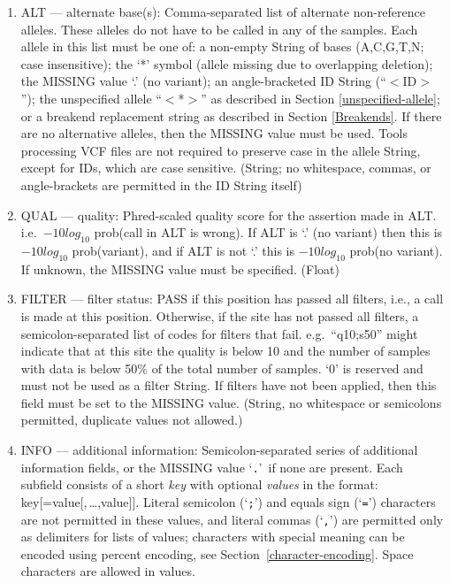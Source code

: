 \documentclass[8pt]{article}
\begin{document}
\begin{enumerate}
  \item ALT --- alternate base(s): Comma-separated list of alternate non-reference alleles.
  \label{fixed-fields-alt}
  These alleles do not have to be called in any of the samples.
  Each allele in this list must be one of: a non-empty String of bases (A,C,G,T,N; case insensitive); the `*' symbol (allele missing due to overlapping deletion); the MISSING value `.' (no variant); an angle-bracketed ID String (``$<$ID$>$''); the unspecified allele ``$<$*$>$'' as described in Section \ref{unspecified-allele}; or a breakend replacement string as described in Section \ref{Breakends}.
  If there are no alternative alleles, then the MISSING value must be used.
  Tools processing VCF files are not required to preserve case in the allele String, except for IDs, which are case sensitive.
  (String; no whitespace, commas, or angle-brackets are permitted in the ID String itself)
  \item QUAL --- quality: Phred-scaled quality score for the assertion made in ALT. i.e.\ $-10log_{10}$ prob(call in ALT is wrong).
  If ALT is `.' (no variant) then this is $-10log_{10}$ prob(variant), and if ALT is not `.' this is $-10log_{10}$ prob(no variant).
  If unknown, the MISSING value must be specified. (Float)
  \item FILTER --- filter status: PASS if this position has passed all filters, i.e., a call is made at this position.
  Otherwise, if the site has not passed all filters, a semicolon-separated list of codes for filters that fail. e.g.\ ``q10;s50'' might indicate that at this site the quality is below 10 and the number of samples with data is below 50\% of the total number of samples.
  `0' is reserved and must not be used as a filter String.
  If filters have not been applied, then this field must be set to the MISSING value.
  (String, no whitespace or semicolons permitted, duplicate values not allowed.)
  \item INFO --- additional information: Semicolon-separated series of additional information fields, or the MISSING value `{\tt .}'\ if none are present.
  Each subfield consists of a short \emph{key} with optional \emph{values} in the format: key[=value[,\,\ldots,value]].
  Literal semicolon (`{\tt ;}') and equals sign (`{\tt =}') characters are not permitted in these values, and literal commas (`{\tt ,}') are permitted only as delimiters for lists of values; characters with special meaning can be encoded using percent encoding, see Section~\ref{character-encoding}.
  Space characters are allowed in values.


\end{enumerate}
\end{document}
